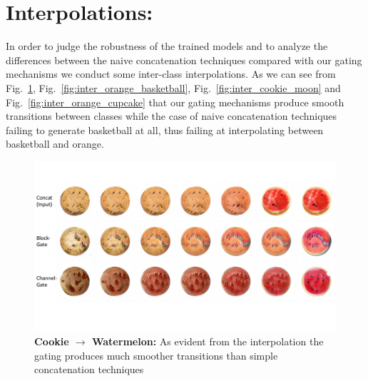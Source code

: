 \documentclass[10pt,twocolumn,letterpaper]{article}
\def\figref#1{Fig.~\ref{#1}}
\begin{document}
\section{Interpolations:}
In order to judge the robustness of the trained models and to analyze the differences between the naive concatenation techniques compared with our gating mechanisms we conduct some inter-class interpolations. As we can see from \figref{fig:inter_watermelon_cookie}, \figref{fig:inter_orange_basketball}, \figref{fig:inter_cookie_moon} and \figref{fig:inter_orange_cupcake} that our gating mechanisms produce smooth transitions between classes while the case of naive concatenation techniques failing to generate basketball at all, thus failing at interpolating between basketball and orange.


{\small


}

\begin{figure}[t]
    \centering
    \includegraphics[width=\linewidth]{interpolation-watermelon-cookie.pdf}
    \caption{{\bf Cookie $\rightarrow$ Watermelon:} As evident from the interpolation the gating produces much smoother transitions than simple concatenation techniques }
    \label{fig:inter_watermelon_cookie}
    \vspace{-3mm}
\end{figure}
\end{document}
